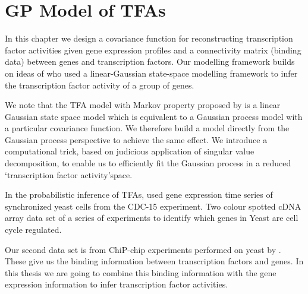 
\chapter{GP Model of TFAs}\label{ch:GP_Model_of_TFAs}

\ifpdf
    \graphicspath{{Chapter4/Figs/Raster/}{Chapter4/Figs/PDF/}{Chapter4/Figs/}}
\else
    \graphicspath{{Chapter4/Figs/Vector/}{Chapter4/Figs/}}
\fi

In this chapter we design a covariance function for reconstructing transcription factor activities given gene expression profiles and a connectivity matrix (binding data) between genes and transcription factors. Our modelling framework builds on ideas of \cite{Sanguinetti:2006} who used a linear-Gaussian state-space modelling framework to infer the transcription factor activity of a group of genes. 

We note that the TFA model with Markov property proposed by \cite{Sanguinetti:2006} is a linear Gaussian state space model which is equivalent to a Gaussian process model with a particular covariance function. We therefore build a model directly from the Gaussian process perspective to achieve the same effect. We introduce a computational trick, based on  judicious application of singular value decomposition, to enable us to efficiently fit the Gaussian process in a reduced \lq transcription factor activity\rq space. 

In the probabilistic inference of TFAs, \cite{Spellman:1998} used gene expression time series of synchronized yeast cells from the CDC-15 experiment. Two colour spotted cDNA array data set of a series of experiments to identify which genes in Yeast are cell cycle regulated. %

Our second data set is from ChiP-chip experiments performed on yeast by \cite{Lee:2002}. These give us the binding information between transcription factors and genes. In this thesis we are going to combine this binding information with the gene expression information to infer transcription factor activities.

